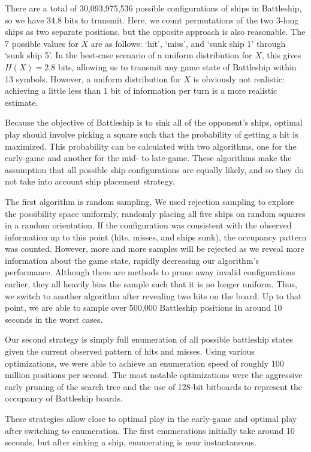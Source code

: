 \documentclass[conference,letterpaper]{IEEEtran}
\begin{document}
There are a total of 30,093,975,536 possible configurations of ships in Battleship, so we have 34.8 bits to transmit. Here, we count permutations of the two 3-long ships as two separate positions, but the opposite approach is also reasonable. The 7 possible values for $X$ are as follows: `hit', `miss', and `sunk ship 1' through `sunk ship 5'. In the best-case scenario of a uniform distribution for $X$, this gives $H(X) = 2.8$ bits, allowing us to transmit any game state of Battleship within 13 symbols. However, a uniform distribution for $X$ is obviously not realistic: achieving a little less than 1 bit of information per turn is a more realistic estimate.

Because the objective of Battleship is to sink all of the opponent's ships, optimal play should involve picking a square such that the probability of getting a hit is maximized. This probability can be calculated with two algorithms, one for the early-game and another for the mid- to late-game. These algorithms make the assumption that all possible ship configurations are equally likely, and so they do not take into account ship placement strategy.

The first algorithm is random sampling. We used rejection sampling to explore the possibility space uniformly, randomly placing all five ships on random squares in a random orientation. If the configuration was consistent with the observed information up to this point (hits, misses, and ships sunk), the occupancy pattern was counted. However, more and more samples will be rejected as we reveal more information about the game state, rapidly decreasing our algorithm's performance. Although there are methods to prune away invalid configurations earlier, they all heavily bias the sample such that it is no longer uniform. Thus, we switch to another algorithm after revealing two hits on the board. Up to that point, we are able to sample over 500,000 Battleship positions in around 10 seconds in the worst cases.

Our second strategy is simply full enumeration of all possible battleship states given the current observed pattern of hits and misses. Using various optimizations, we were able to achieve an enumeration speed of roughly 100 million positions per second. The most notable optimizations were the aggressive early pruning of the search tree and the use of 128-bit bitboards to represent the occupancy of Battleship boards.

These strategies allow close to optimal play in the early-game and optimal play after switching to enumeration. The first enumerations initially take around 10 seconds, but after sinking a ship, enumerating is near instantaneous.
\end{document}
